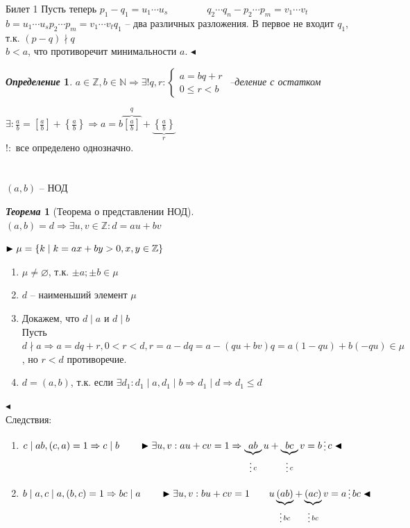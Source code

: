 \documentclass[a4paper,12pt]{article}
\newcommand{\divisible}{\mathop{\raisebox{-2pt}{\vdots}}}
\newtheorem{deff}{\textit{Определение}}
\newtheorem{teo}{\textit{Теорема}}
\newcommand{\q}{\quad}
\newcommand{\pb}{\blacktriangleright}
\newcommand{\pe}{\blacktriangleleft}
\newcommand{\Ra}{\Rightarrow}
\newcommand{\bb}[1]{\mathbb{#1}}
\begin{document}
\newpage
\begin{mybox}{{Билет 1}}
Пусть теперь $p_1 - q_1 = u_1\cdots u_s\q\q\q\q q_2\cdots q_n - p_2\cdots p_m = v_1\cdots v_t$\\
$b = u_1\cdots u_s p_2\cdots p_m = v_1\cdots v_t q_1$ -- два различных разложения. В первое не входит $q_1$, т.к. $(p-q)\nmid q$\\
$b < a$, что противоречит минимальности $a$.
 $\pe$\\
\begin{formbox}{}
\begin{deff} $a\in \bb{Z}, b\in\bb{N}\Rightarrow \exists ! q,r: \begin{cases} a = bq+r\\0 \le r < b\end{cases} $ --деление с остатком
\end{deff}
\end{formbox}
$\exists: \frac{a}{b} = \left[\frac{a}{b}\right] + \left\{\frac{a}{b}\right\}\Rightarrow a = b\overbrace{\left[\frac{a}{b}\right]}^q + \underbrace{\left\{\frac{a}{b}\right\}}_r$\\
$!:$ все определено однозначно.\\\q\\\q\\
$(a,b)$ -- НОД\\

\begin{formbox}{}
\begin{teo}[Теорема о представлении НОД]\q\\
$(a,b) = d \Ra \exists u,v\in\bb{Z}: d = au+bv$
\end{teo}
\end{formbox}
$\pb\\\mu = \{k\mid k=ax+by>0, x,y\in\bb{Z}\}$\\
\begin{enumerate}
\item $\mu \not= \varnothing$, т.к. $\pm a; \pm b \in\mu$
\item $d$ -- наименьший элемент $\mu$
\item Докажем, что $d\mid a$ и $d\mid b$\\
Пусть $d\nmid a \Ra a = dq+r, 0 < r < d, r = a - dq = a - (qu+bv)q = a(1-qu) + b(-qu)\in \mu$, но $r<d$  противоречие.\\
\item $d = (a,b)$, т.к. если $\exists d_1: d_1\mid a, d_1\mid b\Ra d_1\mid d\Ra d_1 \le d$
\end{enumerate}
$\pe$\\
Следствия:\\
\begin{enumerate}
    \item $c\mid ab, (c,a) = 1\Ra c\mid b\q\q \pb  \exists u,v: au+cv = 1\Ra \underbrace{ab}_{\divisible c}u + \underbrace{bc}_{\divisible c}v = b \divisible c   \pe$
    \item $b\mid a, c\mid a, (b,c) = 1\Ra bc\mid a\q\q    \pb  \exists u,v: bu+cv=1\q\q u\underbrace{(ab)}_{\divisible bc} + \underbrace{(ac)}_{\divisible bc}v = a \divisible bc  \pe$
\end{enumerate}
\end{mybox}
\end{document}
